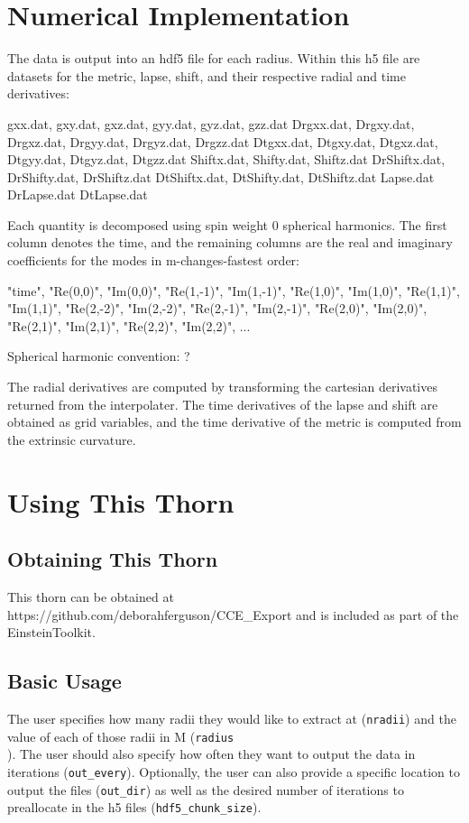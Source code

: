 \section{Numerical Implementation}

The data is output into an hdf5 file for each radius. Within this h5 file are datasets for the metric, lapse, shift, and
their respective radial and time derivatives:

gxx.dat, gxy.dat, gxz.dat, gyy.dat, gyz.dat, gzz.dat
Drgxx.dat, Drgxy.dat, Drgxz.dat, Drgyy.dat, Drgyz.dat, Drgzz.dat
Dtgxx.dat, Dtgxy.dat, Dtgxz.dat, Dtgyy.dat, Dtgyz.dat, Dtgzz.dat
Shiftx.dat, Shifty.dat, Shiftz.dat
DrShiftx.dat, DrShifty.dat, DrShiftz.dat
DtShiftx.dat, DtShifty.dat, DtShiftz.dat
Lapse.dat
DrLapse.dat
DtLapse.dat

Each quantity is decomposed using spin weight 0 spherical harmonics. The first column denotes the time, and the remaining
columns are the real and imaginary coefficients for the modes in m-changes-fastest order:

"time", "Re(0,0)", "Im(0,0)", "Re(1,-1)", "Im(1,-1)", "Re(1,0)", "Im(1,0)",
"Re(1,1)", "Im(1,1)", "Re(2,-2)", "Im(2,-2)", "Re(2,-1)", "Im(2,-1)", "Re(2,0)",
"Im(2,0)", "Re(2,1)", "Im(2,1)", "Re(2,2)", "Im(2,2)", ...

Spherical harmonic convention: ?

The radial derivatives are computed by transforming the cartesian derivatives returned from the interpolater. 
The time derivatives of the lapse and shift are obtained as grid variables, and the time derivative of the metric
is computed from the extrinsic curvature. 

\section{Using This Thorn}

\subsection{Obtaining This Thorn}

This thorn can be obtained at https://github.com/deborahferguson/CCE_Export and is included as part of the EinsteinToolkit.

\subsection{Basic Usage}

The user specifies how many radii they would like to extract at (\texttt{nradii}) and the value of each of those radii 
in M (\texttt{radius\[\]}). The user should also specify how often they want to output the data in iterations (\texttt{out\_every}).
Optionally, the user can also provide a specific location to output the files (\texttt{out\_dir}) as well as the desired 
number of iterations to preallocate in the h5 files (\texttt{hdf5\_chunk\_size}).

